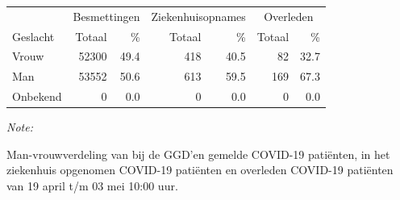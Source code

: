 \documentclass[
  english,
  man,floatsintext]{apa6}
\begin{document}
\begin{table}
\centering\begingroup\fontsize{11}{13}\selectfont

\begin{threeparttable}
\begin{tabular}{lrrrrrr}
\toprule
\multicolumn{1}{c}{ } & \multicolumn{2}{c}{Besmettingen} & \multicolumn{2}{c}{Ziekenhuisopnames} & \multicolumn{2}{c}{Overleden} \\
\cmidrule(l{3pt}r{3pt}){2-3} \cmidrule(l{3pt}r{3pt}){4-5} \cmidrule(l{3pt}r{3pt}){6-7}
Geslacht & Totaal & \% & Totaal & \% & Totaal & \%\\
\midrule
Vrouw & 52300 & 49.4 & 418 & 40.5 & 82 & 32.7\\
Man & 53552 & 50.6 & 613 & 59.5 & 169 & 67.3\\
Onbekend & 0 & 0.0 & 0 & 0.0 & 0 & 0.0\\
\bottomrule
\end{tabular}
\begin{tablenotes}
\item \textit{Note: } 
\item Man-vrouwverdeling van bij de GGD’en gemelde COVID-19 patiënten, in het ziekenhuis opgenomen COVID-19 patiënten en overleden COVID-19 patiënten van 19 april t/m 03 mei 10:00 uur.
\end{tablenotes}
\end{threeparttable}
\endgroup{}
\end{table}
\newpage
\end{document}
